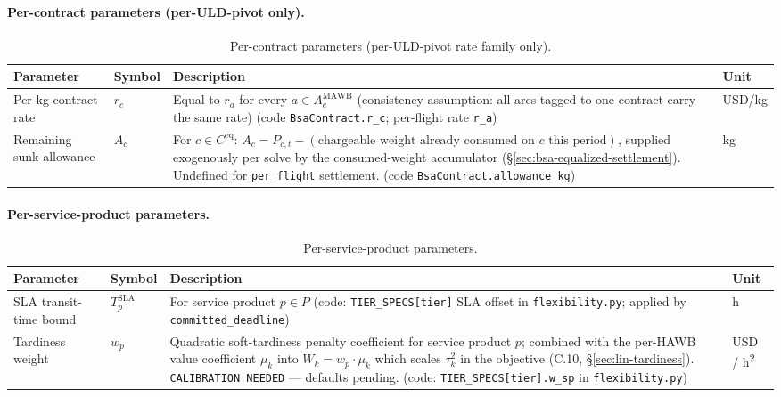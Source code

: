 \documentclass[11pt,a4paper]{article}
\theoremstyle{definition}
\begin{document}
\paragraph{Per-contract parameters (per-ULD-pivot only).}
\begin{table}[H]
\centering
\caption{Per-contract parameters (per-ULD-pivot rate family only).}
\label{tab:per-contract-params}
\begin{tabular}{p{2.8cm}p{2.5cm}p{7cm}p{1.5cm}}
\toprule
Parameter & Symbol & Description & Unit \\
\midrule
Per-kg contract rate & $r_c$ & Equal to $r_a$ for every $a \in A_c^{\text{MAWB}}$ (consistency assumption: all arcs tagged to one contract carry the same rate) (code \texttt{BsaContract.r\_c}; per-flight rate \texttt{r\_a}) & USD/kg \\
Remaining sunk allowance & $A_c$ & For $c \in C^{\text{eq}}$: $A_c = P_{c,t} - (\text{chargeable weight already consumed on $c$ this period})$, supplied exogenously per solve by the consumed-weight accumulator (\S\ref{sec:bsa-equalized-settlement}). Undefined for \texttt{per\_flight} settlement. (code \texttt{BsaContract.allowance\_kg}) & kg \\
\bottomrule
\end{tabular}
\end{table}

\paragraph{Per-service-product parameters.}
\begin{table}[H]
\centering
\caption{Per-service-product parameters.}
\label{tab:service-product-params}
\begin{tabular}{p{2.8cm}p{2.5cm}p{7cm}p{1.5cm}}
\toprule
Parameter & Symbol & Description & Unit \\
\midrule
SLA transit-time bound & $T^{\text{SLA}}_p$ & For service product $p \in P$ (code: \texttt{TIER\_SPECS[tier]} SLA offset in \texttt{flexibility.py}; applied by \texttt{committed\_deadline}) & h \\
Tardiness weight & $w_p$ & Quadratic soft-tardiness penalty coefficient for service product $p$; combined with the per-HAWB value coefficient $\mu_k$ into $W_k = w_p \cdot \mu_k$ which scales $\tau_k^2$ in the objective (C.10, \S\ref{sec:lin-tardiness}). \texttt{CALIBRATION NEEDED} --- defaults pending. (code: \texttt{TIER\_SPECS[tier].w\_sp} in \texttt{flexibility.py}) & USD / h\textsuperscript{2} \\
\bottomrule
\end{tabular}
\end{table}
\end{document}
